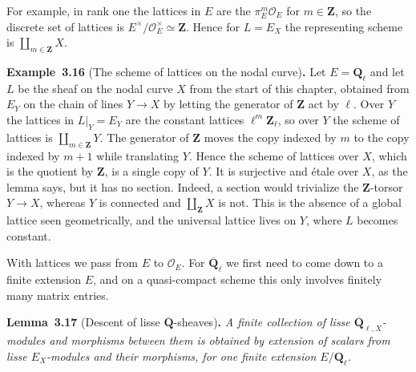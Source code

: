 \documentclass[11pt]{article}
\newenvironment{bpstatement}[2]{\par\addvspace{0.6\baselineskip}\noindent\textbf{#1}#2\textbf{.}\enspace\ignorespaces}
  {\par\addvspace{0.4\baselineskip}}
\newenvironment{bpstatementit}[2]{\begin{bpstatement}{#1}{#2}\itshape\ignorespaces}{\end{bpstatement}}
\providecommand{\Qbar}{}\renewcommand{\Qbar}{\overline{\mathbf Q}}
\providecommand{\QbarX}{}\renewcommand{\QbarX}{\overline{\mathbf Q}_{\ell,X}}
\begin{document}
\label{bp242}%
For example, in rank one the lattices in \(E\) are the \(\pi_E^m\mathcal O_E\) for \(m\in\mathbf Z\), so the discrete set of lattices is \(E^\times/\mathcal O_E^\times\simeq\mathbf Z\). Hence for \(L=E_X\) the representing scheme is \(\coprod_{m\in\mathbf Z}X\).

\label{bp243}%
\begin{bpstatement}{Example~3.16}{ (The scheme of lattices on the nodal curve)}
Let \(E=\mathbf Q_\ell\) and let \(L\) be the sheaf on the nodal curve \(X\) from the start of this chapter, obtained from \(E_Y\) on the chain of lines \(Y\to X\) by letting the generator of \(\mathbf Z\) act by \(\ell\). Over \(Y\) the lattices in \(L|_Y=E_Y\) are the constant lattices \(\ell^m\mathbf Z_\ell\), so over \(Y\) the scheme of lattices is \(\coprod_{m\in\mathbf Z}Y\). The generator of \(\mathbf Z\) moves the copy indexed by \(m\) to the copy indexed by \(m+1\) while translating \(Y\). Hence the scheme of lattices over \(X\), which is the quotient by \(\mathbf Z\), is a single copy of \(Y\). It is surjective and étale over \(X\), as the lemma says, but it has no section. Indeed, a section would trivialize the \(\mathbf Z\)-torsor \(Y\to X\), whereas \(Y\) is connected and \(\coprod_{\mathbf Z}X\) is not. This is the absence of a global lattice seen geometrically, and the universal lattice lives on \(Y\), where \(L\) becomes constant.
\end{bpstatement}

\label{bp244}%
With lattices we pass from \(E\) to \(\mathcal O_E\). For \(\overline{\mathbf Q}_\ell\) we first need to come down to a finite extension \(E\), and on a quasi-compact scheme this only involves finitely many matrix entries.

\label{bp245}%
\begin{bpstatementit}{Lemma~3.17}{ (Descent of lisse $\Qbar$-sheaves)}
A finite collection of lisse \(\QbarX\)-modules and morphisms between them is obtained by extension of scalars from lisse \(E_X\)-modules and their morphisms, for one finite extension \(E/\mathbf Q_\ell\).
\end{bpstatementit}
\end{document}
